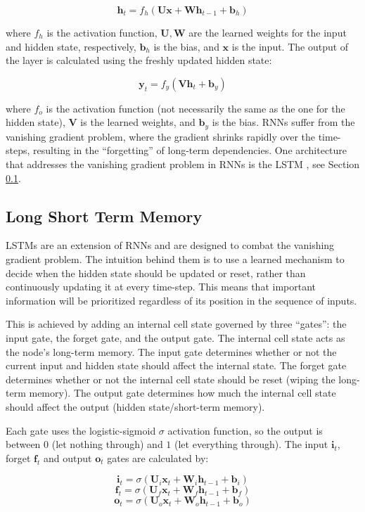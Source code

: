 \documentclass{article}
\begin{document}
\[\mathbf{h}_t = f_h(\mathbf{Ux} + \mathbf{Wh}_{t-1} + \mathbf{b}_h)\]

where \(f_h\) is the activation function, \(\mathbf{U}, \mathbf{W}\) are the learned weights for the input and hidden state, respectively, \(\mathbf{b}_h\) is the bias, and \(\mathbf{x}\) is the input. The output of the layer is calculated using the freshly updated hidden state:

\[\mathbf{y}_t = f_y(\mathbf{Vh}_t + \mathbf{b}_y)\]

where \(f_o\) is the activation function (not necessarily the same as the one for the hidden state), \(\mathbf{V}\) is the learned weights, and \(\mathbf{b}_y\) is the bias. RNNs suffer from the vanishing gradient problem, where the gradient shrinks rapidly over the time-steps, resulting in the ``forgetting'' of long-term dependencies. One architecture that addresses the vanishing gradient problem in RNNs is the LSTM \citep{lstm}, see Section \ref{LSTM_sec}.

\subsection{Long Short Term Memory}\label{LSTM_sec}

LSTMs are an extension of RNNs and are designed to combat the vanishing gradient problem. The intuition behind them is to use a learned mechanism to decide when the hidden state should be updated or reset, rather than continuously updating it at every time-step. This means that important information will be prioritized regardless of its position in the sequence of inputs.

This is achieved by adding an internal cell state governed by three ``gates'': the input gate, the forget gate, and the output gate. The internal cell state acts as the node's long-term memory. The input gate determines whether or not the current input and hidden state should affect the internal state. The forget gate determines whether or not the internal cell state should be reset (wiping the long-term memory). The output gate determines how much the internal cell state should affect the output (hidden state/short-term memory).

Each gate uses the logistic-sigmoid \(\sigma\) activation function, so the output is between \(0\) (let nothing through) and \(1\) (let everything through). The input \(\mathbf{i}_t\), forget \(\mathbf{f}_t\) and output \(\mathbf{o}_t\) gates are calculated by:

\[\mathbf{i}_t = \sigma(\mathbf{U}_i\mathbf{x}_t + \mathbf{W}_i\mathbf{h}_{t-1} + \mathbf{b}_i)\]
\[\mathbf{f}_t = \sigma(\mathbf{U}_f\mathbf{x}_t + \mathbf{W}_f\mathbf{h}_{t-1} + \mathbf{b}_f)\]
\[\mathbf{o}_t = \sigma(\mathbf{U}_o\mathbf{x}_t + \mathbf{W}_o\mathbf{h}_{t-1} + \mathbf{b}_o)\]
\end{document}
